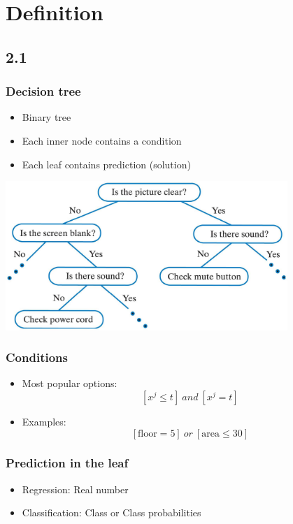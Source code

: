 \documentclass[default]{beamer}
\begin{document}
	\section{Definition}
	\subsection{2.1}
	\begin{frame}
		\frametitle{Decision tree}
		\Large
		\begin{itemize}
			\item Binary tree
			\item Each inner node contains a condition
			\item Each leaf contains prediction (solution)
		\end{itemize}
	
		\centering
		\includegraphics[width=0.8\textwidth]{trees4.jpg}
	\end{frame}


	\begin{frame}
		\frametitle{Conditions}
		
		\Large
		\begin{itemize}
			\item Most popular options:
			\[
				[x^j\le t]\ and\ [x^j = t]
			\]
			\item Examples:
			\[
				[\text{floor} = 5]\ or\ [\text{area} \le 30]
			\]
		\end{itemize}
	\end{frame}

	\begin{frame}
		\frametitle{Prediction in the leaf}
		
		\Large
		\begin{itemize}
			\item Regression: Real number
			\item Classification: Class or Class probabilities
		\end{itemize}
	\end{frame}
\end{document}
